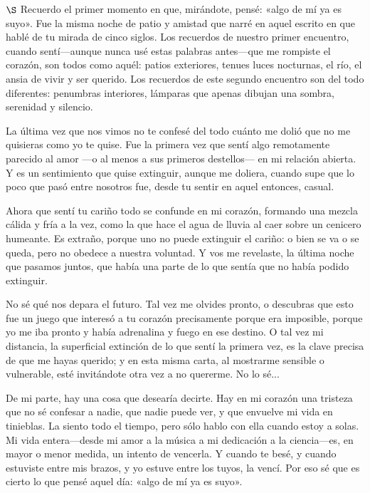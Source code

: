 \documentclass[a4paper, 12pt]{article}
\begin{document}
\pagebreak 

$\S$ Recuerdo el primer momento en que, mirándote, pensé: «algo de mí ya es
suyo». Fue la misma noche de patio y amistad que narré en aquel escrito en que
hablé de tu mirada de cinco siglos. Los recuerdos de nuestro primer encuentro,
cuando sentí---aunque nunca usé estas palabras antes---que me rompiste el
corazón, son todos como aquél: patios exteriores, tenues luces nocturnas, el
río, el ansia de vivir y ser querido. Los recuerdos de este segundo encuentro
son del todo diferentes: penumbras interiores, lámparas que apenas dibujan una
sombra, serenidad y silencio.

La última vez que nos vimos no te confesé del todo cuánto me dolió que no me
quisieras como yo te quise. Fue la primera vez que sentí algo remotamente
parecido al amor ---o al menos a sus primeros destellos--- en mi relación
abierta. Y es un sentimiento que quise extinguir, aunque me doliera, cuando supe
que lo poco que pasó entre nosotros fue, desde tu sentir en aquel entonces,
casual. 

Ahora que sentí tu cariño todo se confunde en mi corazón, formando una mezcla
cálida y fría a la vez, como la que hace el agua de lluvia al caer sobre un
cenicero humeante. Es extraño, porque uno no puede extinguir el cariño: o bien
se va o se queda, pero no obedece a nuestra voluntad. Y vos me revelaste, la
última noche que pasamos juntos, que había una parte de lo que sentía que no
había podido extinguir. 

No sé qué nos depara el futuro. Tal vez me olvides pronto, o descubras que esto
fue un juego que interesó a tu corazón precisamente porque era imposible, porque
yo me iba pronto y había adrenalina y fuego en ese destino. O tal vez mi
distancia, la superficial extinción de lo que sentí la primera vez, es la clave
precisa de que me hayas querido; y en esta misma carta, al mostrarme sensible o
vulnerable,
esté invitándote otra vez a no quererme. No lo sé... 

De mi parte, hay una cosa que desearía decirte. Hay en mi corazón una tristeza
que no sé confesar a nadie, que nadie puede ver, y que envuelve mi vida en
tinieblas. La siento todo el tiempo, pero sólo hablo con ella cuando estoy a
solas. Mi vida entera---desde mi amor a la música a mi dedicación a la
ciencia---es, en mayor o menor medida, un intento de vencerla. Y cuando te besé,
y cuando estuviste entre mis brazos, y yo estuve entre los tuyos, la vencí. Por
eso sé que es cierto lo que pensé aquel día: «algo de mí ya es suyo».
\end{document}

